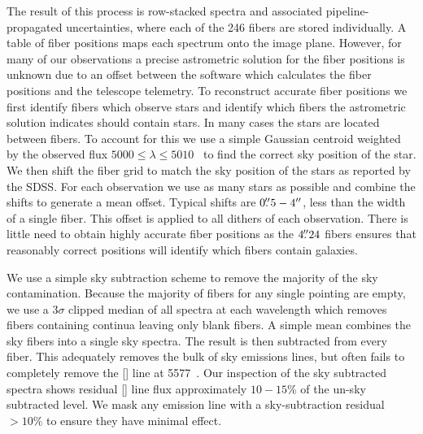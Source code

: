 The result of this process is row-stacked spectra and associated pipeline-propagated uncertainties, where each of the 246 fibers are stored individually. A table of fiber positions maps each spectrum onto the image plane. However, for many of our observations a precise astrometric solution for the fiber positions is unknown due to an offset between the software which calculates the fiber positions and the telescope telemetry. To reconstruct accurate fiber positions we first identify fibers which observe stars and identify which fibers the astrometric solution indicates should contain stars. In many cases the stars are located between fibers. To account for this we use a simple Gaussian centroid weighted by the observed flux $5000 \leq \lambda \leq 5010$ \AAA\ to find the correct sky position of the star. We then shift the fiber grid to match the sky position of the stars as reported by the SDSS. For each observation we use as many stars as possible and combine the shifts to generate a mean offset. Typical shifts are $0\mbox{\ensuremath{.\!\!^{\prime\prime}}}5 - 4''$, less than the width of a single fiber. This offset is applied to all dithers of each observation. There is little need to obtain highly accurate fiber positions as the $4\mbox{\ensuremath{.\!\!^{\prime\prime}}}24$ fibers ensures that reasonably correct positions will identify which fibers contain galaxies.

We use a simple sky subtraction scheme to remove the majority of the sky contamination. Because the majority of fibers for any single pointing are empty, we use a $3\sigma$ clipped median of all spectra at each wavelength which removes fibers containing continua leaving only blank fibers. A simple mean combines the sky fibers into a single sky spectra. The result is then subtracted from every fiber. This adequately removes the bulk of sky emissions lines, but often fails to completely remove the [] line at 5577~\AAA. Our inspection of the sky subtracted spectra shows residual [] line flux approximately $10-15$\% of the un-sky subtracted level. We mask any emission line with a sky-subtraction residual $>10\%$ to ensure they have minimal effect.

